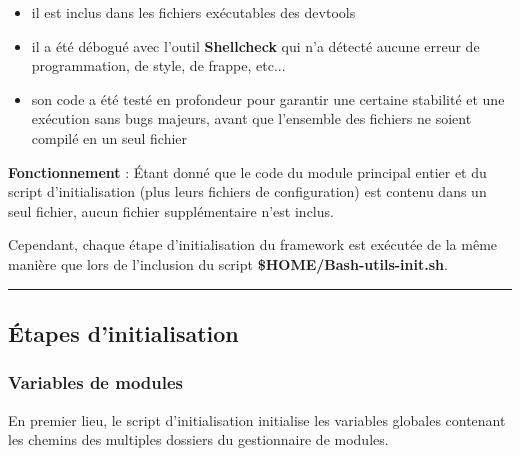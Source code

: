 \documentclass[a4paper,10pt]{article}
\begin{document}
\begin{justify}
    \begin{itemize}
        \item il est inclus dans les fichiers exécutables des devtools

        \item il a été débogué avec l'outil \textbf{\color{gray}Shellcheck} qui n'a détecté aucune erreur de programmation, de style, de frappe, etc...

        \item son code a été testé en profondeur pour garantir une certaine stabilité et une exécution sans bugs majeurs, avant que l'ensemble des fichiers ne soient compilé en un seul fichier
    \end{itemize}
\end{justify}

\begin{justify}
    \textbf{Fonctionnement} : Étant donné que le code du module principal entier et du script d'initialisation (plus leurs fichiers de configuration) est contenu dans un seul fichier, aucun fichier supplémentaire n'est inclus.
\end{justify}

\begin{justify}
    Cependant, chaque étape d'initialisation du framework est exécutée de la même manière que lors de l'inclusion du script \textbf{\color{orange}\$HOME/\color{lime}Bash-utils-init.sh}.
\end{justify}




\color{green}\par\noindent\rule{\textwidth}{0.4pt}\color{white}

\color{green}
\subsection{Étapes d'initialisation}\color{white}

\color{blue}
\subsubsection{Variables de modules}\color{white}

\begin{justify}
    En premier lieu, le script d'initialisation initialise les variables globales contenant les chemins des multiples dossiers du gestionnaire de modules.
\end{justify}
\end{document}
